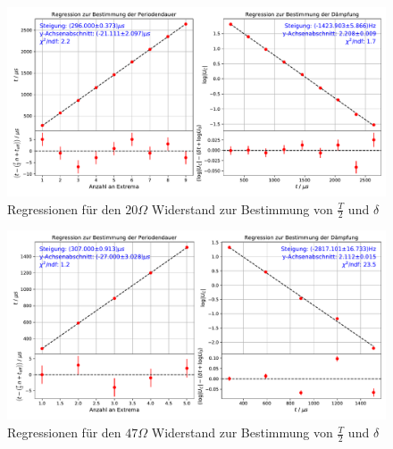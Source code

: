 \documentclass[a4paper, 12pt]{scrartcl}
\begin{document}
\begin{figure}[H]
\centering
\includegraphics[width=\textwidth]{plots/reg_schwingung4.pdf}
\caption{Regressionen für den $20\Omega$ Widerstand zur Bestimmung von $\frac{T}{2}$ und $\delta$}
\end{figure}
\begin{figure}[H]
\centering
\includegraphics[width=\textwidth]{plots/reg_schwingung5.pdf}
\caption{Regressionen für den $47\Omega$ Widerstand zur Bestimmung von $\frac{T}{2}$ und $\delta$}
\end{figure}
\end{document}
